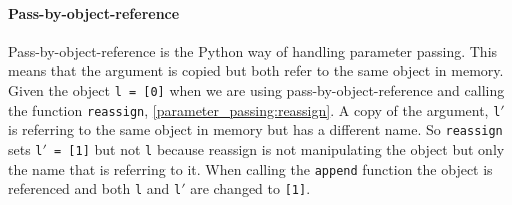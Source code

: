 \paragraph{Pass-by-object-reference}
Pass-by-object-reference is the Python way of handling parameter passing.
This means that the argument is copied but both refer to the same object in memory.
Given the object \texttt{l = [0]} when we are using pass-by-object-reference and calling the function \texttt{reassign}, \cref{parameter_passing:reassign}.
A copy of the argument, \texttt{l$'$} is referring to the same object in memory but has a different name.
So \texttt{reassign} sets \texttt{l$'$ = [1]} but not \texttt{l} because reassign is not manipulating the object but only the name that is referring to it.
When calling the \texttt{append} function the object is referenced and both \texttt{l} and \texttt{l$'$} are changed to \texttt{[1]}.
